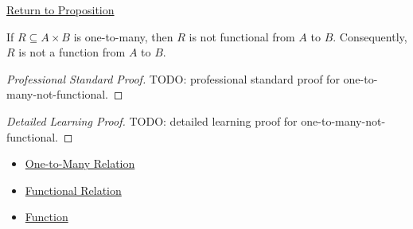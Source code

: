 \newpage
{}
\label{prf:one-to-many-not-functional}

\begin{remark*}[Return]
\hyperref[prop:one-to-many-not-functional]{Return to Proposition}
\end{remark*}

\begin{proposition*}
If $R\subseteq A\times B$ is one-to-many, then $R$ is not functional from $A$
to $B$. Consequently, $R$ is not a function from $A$ to $B$.
\end{proposition*}

\begin{proof}[Professional Standard Proof]
\LRAProofBodyStart
TODO: professional standard proof for one-to-many-not-functional.
\end{proof}

\begin{proof}[Detailed Learning Proof]
\LRAProofBodyStart
TODO: detailed learning proof for one-to-many-not-functional.
\end{proof}

\begin{remark*}

\end{remark*}

\begin{dependencies}
\begin{itemize}
  \item \hyperref[def:one-to-many-relation]{One-to-Many Relation}
  \item \hyperref[def:functional-relation]{Functional Relation}
  \item \hyperref[def:function]{Function}
\end{itemize}
\end{dependencies}

\clearpage

